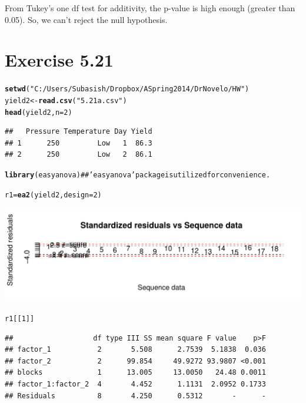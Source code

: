 \documentclass[a4paper]{article}\usepackage{graphicx, color}
\makeatletter
\def\maxwidth{ %
  \ifdim\Gin@nat@width>\linewidth
    \linewidth
  \else
    \Gin@nat@width
  \fi
}
\newcommand{\hlfunctioncall}[1]{\textcolor[rgb]{0.501960784313725,0,0.329411764705882}{\textbf{#1}}}%
\newcommand{\hlstring}[1]{\textcolor[rgb]{0.6,0.6,1}{#1}}%
\newcommand{\hlcomment}[1]{\textcolor[rgb]{0.180392156862745,0.6,0.341176470588235}{#1}}%
\newenvironment{kframe}{%
 \def\at@end@of@kframe{}%
 \ifinner\ifhmode%
  \def\at@end@of@kframe{\end{minipage}}%
  \begin{minipage}{\columnwidth}%
 \fi\fi%
 \def\FrameCommand##1{\hskip\@totalleftmargin \hskip-\fboxsep
 \colorbox{shadecolor}{##1}\hskip-\fboxsep
     \hskip-\linewidth \hskip-\@totalleftmargin \hskip\columnwidth}%
 \MakeFramed {\advance\hsize-\width
   \@totalleftmargin\z@ \linewidth\hsize
   \@setminipage}}%
 {\par\unskip\endMakeFramed%
 \at@end@of@kframe}
\newenvironment{knitrout}{}{} %
\makeatother
\begin{document}
\vspace{2 mm}
From Tukey's one df test for additivity, the p-value is high enough (greater than 0.05). So, we can't reject the null hypothesis. \\

\section{ Exercise 5.21}
\begin{knitrout}
\color{fgcolor}\begin{kframe}
\begin{alltt}
\hlfunctioncall{setwd}(\hlstring{"C:/Users/Subasish/Dropbox/A Spring 2014/Dr Novelo/HW"})
yield2 <- \hlfunctioncall{read.csv}(\hlstring{"5.21a.csv"})
\hlfunctioncall{head}(yield2, n = 2)
\end{alltt}
\begin{verbatim}
##   Pressure Temperature Day Yield
## 1      250         Low   1  86.3
## 2      250         Low   2  86.1
\end{verbatim}
\begin{alltt}
\hlfunctioncall{library}(easyanova)  \hlcomment{## \hlstring{'easyanova'} package is utilized for convenience.}
\end{alltt}


{\ttfamily\noindent\itshape\color{messagecolor}{\#\# Loading required package: car}}

{\ttfamily\noindent\itshape\color{messagecolor}{\#\# Loading required package: MASS}}

{\ttfamily\noindent\itshape\color{messagecolor}{\#\# Loading required package: nnet}}

{\ttfamily\noindent\itshape\color{messagecolor}{\#\# Loading required package: nlme}}\begin{alltt}
r1 = \hlfunctioncall{ea2}(yield2, design = 2)
\end{alltt}
\end{kframe}
\includegraphics[width=\maxwidth]{figure/unnamed-chunk-9} 
\begin{kframe}\begin{alltt}
r1[[1]]
\end{alltt}
\begin{verbatim}
##                   df type III SS mean square F value    p>F
## factor_1           2       5.508      2.7539  5.1838  0.036
## factor_2           2      99.854     49.9272 93.9807 <0.001
## blocks             1      13.005     13.0050   24.48 0.0011
## factor_1:factor_2  4       4.452      1.1131  2.0952 0.1733
## Residuals          8       4.250      0.5312       -      -
\end{verbatim}
\end{kframe}
\end{knitrout}
\end{document}
